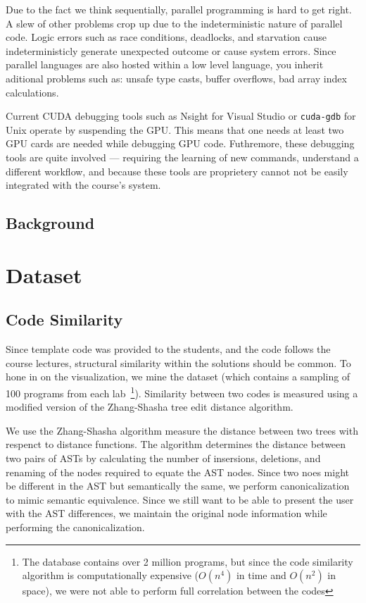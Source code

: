 \documentclass[nocopyrightspace]{sigchi}
\begin{document}
Due to the fact we think sequentially, parallel programming is hard to get
right. A slew of other problems crop up due to the  indeterministic nature of
parallel code. Logic errors such as race conditions, deadlocks, and starvation
cause indeterministicly generate unexpected outcome or cause system errors.
Since parallel languages are also hosted within a low level language,
you inherit aditional problems such as: unsafe type casts, buffer overflows,
bad array index calculations.

Current CUDA debugging tools such as Nsight for Visual Studio or {\tt cuda-gdb}
for Unix operate by suspending the GPU. This means that one needs at least two
GPU cards are needed while debugging GPU code. Futhremore, these debugging tools
are quite involved --- requiring the learning of new commands, understand a
different workflow, and because these tools are proprietery cannot not be easily
integrated with the course's system.


\subsection{Background}

\section{Dataset}


\subsection{Code Similarity}

Since template code was provided to the students, and the code follows the course
lectures, structural similarity within the solutions should be common. To hone in
on the visualization, we mine the dataset (which contains a sampling of 100 programs
from each lab~\footnote{The database contains over 2 million programs, but since
the code similarity algorithm is computationally expensive ($O(n^4)$ in time and $O(n^2)$ in space),
we were not able to perform full correlation between the codes}). Similarity between
two codes is measured using a modified version of the Zhang-Shasha tree edit distance algorithm.

We use the Zhang-Shasha algorithm measure the distance between two trees with respenct to
distance functions. The algorithm determines the distance between two pairs of ASTs by
calculating the number of insersions, deletions, and renaming of the nodes
required to equate the AST nodes. Since two noes might be different in the AST but semantically
the same, we perform canonicalization to mimic semantic equivalence. Since we still want
to be able to present the user with the AST differences, we maintain the original node
information while performing the canonicalization.
\end{document}
